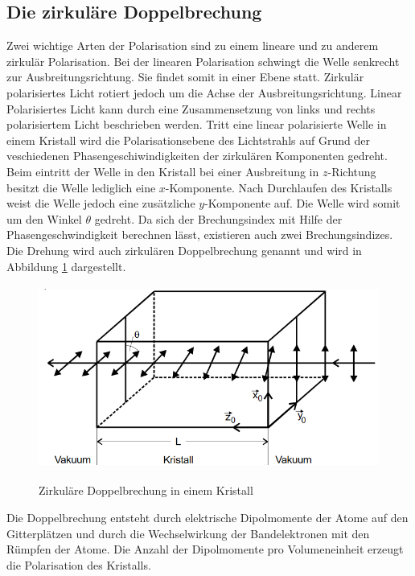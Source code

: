 \subsection{Die zirkuläre Doppelbrechung}
Zwei wichtige Arten der Polarisation sind zu einem lineare und zu anderem
zirkulär Polarisation. Bei der linearen Polarisation schwingt die Welle
senkrecht zur Ausbreitungsrichtung. Sie findet somit in einer Ebene statt.
Zirkulär polarisiertes Licht rotiert jedoch um die Achse der
Ausbreitungsrichtung. Linear Polarisiertes Licht kann durch eine Zusammensetzung
von links und rechts polarisiertem Licht beschrieben werden.
Tritt eine linear polarisierte Welle in einem Kristall wird die
Polarisationsebene des Lichtstrahls auf Grund der veschiedenen
Phasengeschiwindigkeiten der zirkulären Komponenten gedreht.
Beim eintritt der Welle in den Kristall bei einer Ausbreitung in $z$-Richtung
besitzt die Welle lediglich eine $x$-Komponente. Nach Durchlaufen des Kristalls
weist die Welle jedoch eine zusätzliche $y$-Komponente auf. Die Welle wird somit
um den Winkel $\theta$ gedreht. Da sich der Brechungsindex mit Hilfe der
Phasengeschwindigkeit berechnen lässt, existieren auch zwei Brechungsindizes.
Die Drehung wird auch zirkulären Doppelbrechung genannt und wird in
Abbildung \ref{fig:rotation} dargestellt.

\begin{figure}[H]
  \centering
  \includegraphics[width=12cm, height=6cm]{rotation.png}
  \caption{Zirkuläre Doppelbrechung in einem Kristall}
  \label{fig:rotation}
  \cite{skript}
\end{figure}


Die Doppelbrechung entsteht durch elektrische Dipolmomente der Atome auf den
Gitterplätzen und durch die Wechselwirkung der Bandelektronen mit den Rümpfen der
Atome. Die Anzahl der Dipolmomente pro Volumeneinheit erzeugt die Polarisation
des Kristalls.

